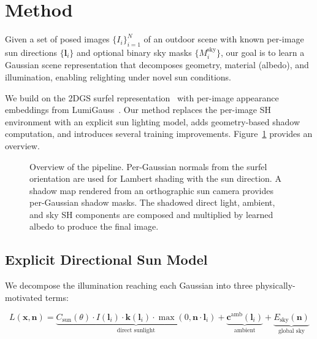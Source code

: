 \section{Method}
\label{sec:method}

Given a set of posed images $\{I_i\}_{i=1}^{N}$ of an outdoor scene with known per-image sun directions $\{\mathbf{l}_i\}$ and optional binary sky masks $\{M_i^{\text{sky}}\}$, our goal is to learn a Gaussian scene representation that decomposes geometry, material (albedo), and illumination, enabling relighting under novel sun conditions.

We build on the 2DGS surfel representation~\cite{huang20242dgs} with per-image appearance embeddings from LumiGauss~\cite{joaxkal2024lumigauss}.
Our method replaces the per-image SH environment with an explicit sun lighting model, adds geometry-based shadow computation, and introduces several training improvements.
Figure~\ref{fig:pipeline} provides an overview.

\begin{figure}[t]
    \centering
    \caption{Overview of the \ours{} pipeline. Per-Gaussian normals from the surfel orientation are used for Lambert shading with the sun direction. A shadow map rendered from an orthographic sun camera provides per-Gaussian shadow masks. The shadowed direct light, ambient, and sky SH components are composed and multiplied by learned albedo to produce the final image.}
    \label{fig:pipeline}
\end{figure}

\subsection{Explicit Directional Sun Model}
\label{sec:sun_model}

We decompose the illumination reaching each Gaussian into three physically-motivated terms:

\begin{equation}
    L(\mathbf{x}, \mathbf{n}) = \underbrace{C_{\text{sun}}(\theta) \cdot I(\mathbf{l}_i) \cdot \mathbf{k}(\mathbf{l}_i) \cdot \max(0, \mathbf{n} \cdot \mathbf{l}_i)}_{\text{direct sunlight}} + \underbrace{\mathbf{c}^{\text{amb}}(\mathbf{l}_i)}_{\text{ambient}} + \underbrace{E_{\text{sky}}(\mathbf{n})}_{\text{global sky}}
    \label{eq:lighting}
\end{equation}

